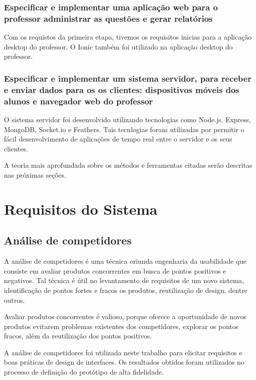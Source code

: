 \subsubsection{Especificar e implementar uma aplicação web para o professor administrar as questões e gerar relatórios}

Com os requistos da primeira etapa, tivemos os requisitos inicias para a aplicação desktop do professor.
O Ionic também foi utilizado na aplicação desktop do professor.

\subsubsection{Especificar e implementar um sistema servidor, para receber e
    enviar dados para os os clientes: dispositivos móveis dos alunos e navegador
    web do professor}

O sistema servidor foi desenvolvido utilizando tecnologias como Node.js, Express, MongoDB, Socket.io e Feathers.
Tais tecnlogias foram utilizadas por permitir o fácil desenvolvimento de aplicações
de tempo real entre o servidor e os seus clientes.

A teoria mais aprofundada sobre os métodos e ferramentas citadas serão descritas nas próximas seções.

\section{Requisitos do Sistema}

\subsection{Análise de competidores}

A análise de competidores é uma técnica oriunda engenharia da usabilidade
que consiste em avaliar produtos concorrentes em busca de pontos positivos e
negativos. Tal técnica é útil no levantamento de requisitos de um novo sistema,
identificação de pontos fortes e fracos os produtos, reutilização de design, dentre outros.

Avaliar produtos concorrentes é valioso, porque oferece a oportunidade de novos
produtos evitarem problemas existentes dos competidores, explorar os pontos
fracos, além da reutilização dos pontos positivos.

A análise de competidores foi utilizada neste trabalho para elicitar requisitos e boas práticas
de design de interfaces. %
Os resultados obtidos foram utilizados no processo de definição do
protótipo de alta fidelidade.

